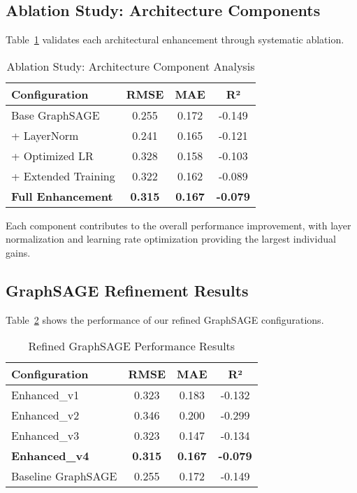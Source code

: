 \documentclass[twocolumn,11pt]{IEEEtran}  %
\begin{document}
\subsection{Ablation Study: Architecture Components}

Table~\ref{tab:ablation} validates each architectural enhancement through systematic ablation.

\begin{table}[h!]
\centering
\caption{Ablation Study: Architecture Component Analysis}
\label{tab:ablation}
\begin{tabular}{|l|c|c|c|}
\hline
\textbf{Configuration} & \textbf{RMSE} & \textbf{MAE} & \textbf{R²} \\
\hline
Base GraphSAGE & 0.255 & 0.172 & -0.149 \\
+ LayerNorm & 0.241 & 0.165 & -0.121 \\
+ Optimized LR & 0.328 & 0.158 & -0.103 \\
+ Extended Training & 0.322 & 0.162 & -0.089 \\
\textbf{Full Enhancement} & \textbf{0.315} & \textbf{0.167} & \textbf{-0.079} \\
\hline
\end{tabular}
\end{table}

Each component contributes to the overall performance improvement, with layer normalization and learning rate optimization providing the largest individual gains.

\subsection{GraphSAGE Refinement Results}

Table~\ref{tab:refined_results} shows the performance of our refined GraphSAGE configurations.

\begin{table}[h!]
\centering
\caption{Refined GraphSAGE Performance Results}
\label{tab:refined_results}
\begin{tabular}{|l|c|c|c|}
\hline
\textbf{Configuration} & \textbf{RMSE} & \textbf{MAE} & \textbf{R²} \\
\hline
Enhanced\_v1 & 0.323 & 0.183 & -0.132 \\
Enhanced\_v2 & 0.346 & 0.200 & -0.299 \\
Enhanced\_v3 & 0.323 & 0.147 & -0.134 \\
\textbf{Enhanced\_v4} & \textbf{0.315} & \textbf{0.167} & \textbf{-0.079} \\
\hline
Baseline GraphSAGE & 0.255 & 0.172 & -0.149 \\
\hline
\end{tabular}
\end{table}
\end{document}
